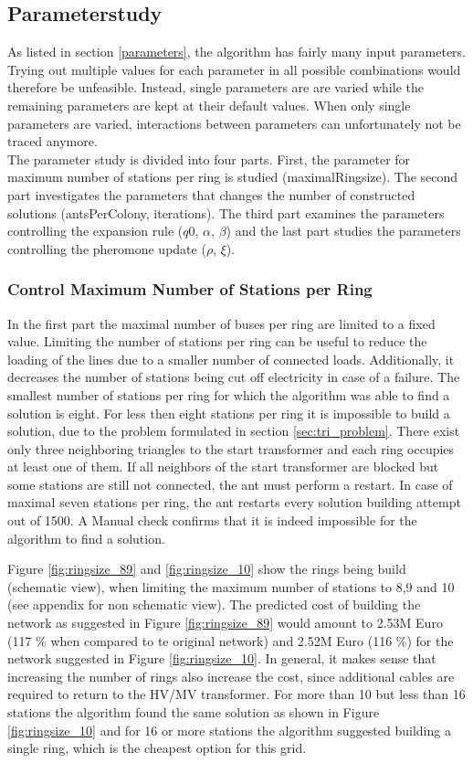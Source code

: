 \subsection{Parameterstudy}
As listed in section \ref{parameters}, the algorithm has fairly many input parameters. Trying out multiple values for each parameter in all possible combinations would therefore be unfeasible. Instead, single parameters are are varied while the remaining parameters are kept at their default values. When only single parameters are varied, interactions between parameters can unfortunately not be traced anymore. \\
The parameter study is divided into four parts. First, the parameter for maximum number of stations per ring is studied (maximalRingsize). The second part investigates the parameters that changes the number of constructed solutions (antsPerColony, iterations). The third part examines the parameters controlling the expansion rule ($q0$, $\alpha$, $\beta$) and the last part studies the parameters controlling the pheromone update ($\rho$, $\xi$).

\subsubsection{Control Maximum Number of Stations per Ring}\label{stations_per_ring}
In the first part the maximal number of buses per ring are limited to a fixed value. Limiting the number of stations per ring can be useful to reduce the loading of the lines due to a smaller number of connected loads. Additionally, it decreases the number of stations being cut off electricity in case of a failure. The smallest number of stations per ring for which the algorithm was able to find a solution is eight. For less then eight stations per ring it is impossible to build a solution, due to the problem formulated in section \ref{sec:tri_problem}. There exist only three neighboring triangles to the start transformer and each ring occupies at least one of them. If all neighbors of the start transformer are blocked but some stations are still not connected, the ant must perform a restart. In case of maximal seven stations per ring, the ant restarts every solution building attempt out of 1500. A Manual check confirms that it is indeed impossible for the algorithm to find a solution.

Figure \ref{fig:ringsize_89} and \ref{fig:ringsize_10} show the rings being build (schematic view), when limiting the maximum number of stations to 8,9 and 10 (see appendix for non schematic view). The predicted cost of building the network as suggested in Figure \ref{fig:ringsize_89} would amount to 2.53M Euro (117 \% when compared to te original network) and 2.52M Euro (116 \%) for the network suggested in Figure \ref{fig:ringsize_10}. In general, it makes sense that increasing the number of rings also increase the cost, since additional cables are required to return to the HV/MV transformer. For more than 10 but less than 16 stations the algorithm found the same solution as shown in Figure \ref{fig:ringsize_10} and for 16 or more stations the algorithm suggested building a single ring, which is the cheapest option for this grid.

